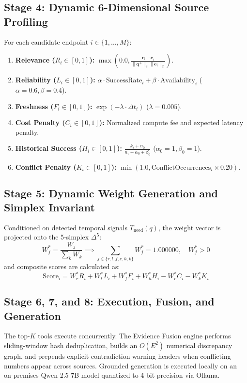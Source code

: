 \documentclass[journal,10pt,twocolumn]{IEEEtran}
\begin{document}
\subsection{Stage 4: Dynamic 6-Dimensional Source Profiling}
For each candidate endpoint $i \in \{1, \dots, M\}$:
\begin{enumerate}
    \item \textbf{Relevance ($R_i \in [0, 1]$):} $\max(0.0, \frac{\mathbf{q}^+ \cdot \mathbf{e}_i}{\|\mathbf{q}^+\|_2 \|\mathbf{e}_i\|_2})$.
    \item \textbf{Reliability ($L_i \in [0, 1]$):} $\alpha \cdot \text{SuccessRate}_i + \beta \cdot \text{Availability}_i$ ($\alpha = 0.6, \beta = 0.4$).
    \item \textbf{Freshness ($F_i \in [0, 1]$):} $\exp(-\lambda \cdot \Delta t_i)$ ($\lambda = 0.005$).
    \item \textbf{Cost Penalty ($C_i \in [0, 1]$):} Normalized compute fee and expected latency penalty.
    \item \textbf{Historical Success ($H_i \in [0, 1]$):} $\frac{k_i + \alpha_0}{n_i + \alpha_0 + \beta_0}$ ($\alpha_0 = 1, \beta_0 = 1$).
    \item \textbf{Conflict Penalty ($K_i \in [0, 1]$):} $\min(1.0, \text{ConflictOccurrences}_i \times 0.20)$.
\end{enumerate}

\subsection{Stage 5: Dynamic Weight Generation and Simplex Invariant}
Conditioned on detected temporal signals $T_{\text{need}}(q)$, the weight vector is projected onto the 5-simplex $\Delta^5$:
\begin{equation}
    W_j^* = \frac{W_j}{\sum_{k} W_k} \implies \sum_{j \in \{r, l, f, c, h, k\}} W_j^* = 1.000000, \quad W_j^* > 0
\end{equation}
and composite scores are calculated as:
\begin{equation}
    \text{Score}_i = W_r^* R_i + W_l^* L_i + W_f^* F_i + W_h^* H_i - W_c^* C_i - W_k^* K_i
\end{equation}

\subsection{Stage 6, 7, and 8: Execution, Fusion, and Generation}
The top-$K$ tools execute concurrently. The Evidence Fusion engine performs sliding-window hash deduplication, builds an $O(E^2)$ numerical discrepancy graph, and prepends explicit contradiction warning headers when conflicting numbers appear across sources. Grounded generation is executed locally on an on-premises Qwen 2.5 7B model quantized to 4-bit precision via Ollama.
\end{document}
